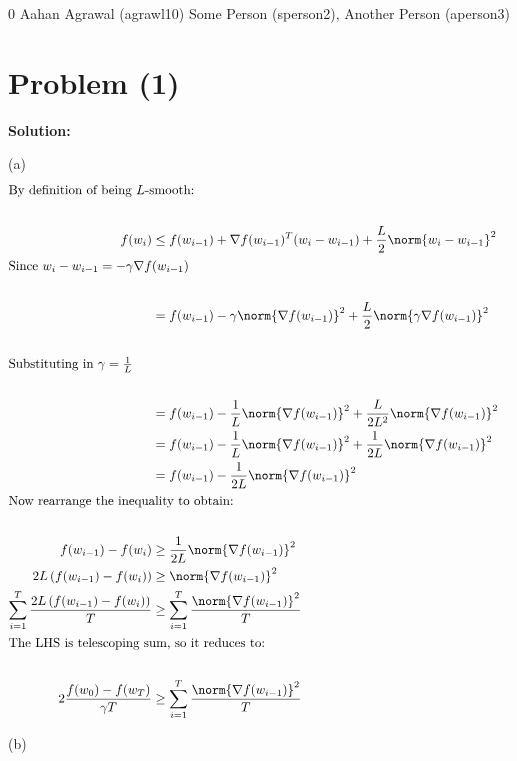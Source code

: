 \documentclass[../main.tex]{subfiles}
\begin{document}
\homework
    {0}
    {Aahan Agrawal (agrawl10)}
    {Some Person (sperson2), Another Person (aperson3)}

\section*{Problem (1)}
\textbf{Solution:} 

(a) \\
\begin{align*}
    \intertext{By definition of being $L$-smooth:} \\
    f(w_i) &\leq f(w_{i-1}) + \nabla f(w_{i-1})^T(w_{i} - w_{i-1}) + \frac{L}{2}\norm{w_{i} - w_{i-1}}^2 \\
    \intertext{Since $w_{i} - w_{i-1} = -\gamma \nabla f(w_{i-1})$} \\
    &= f(w_{i-1}) - \gamma \norm{\nabla f(w_{i-1})}^2 + \frac{L}{2}\norm{\gamma \nabla f(w_{i-1})}^2 \\ \\
    \intertext{Substituting in $\gamma = \frac{1}{L}$} \\
    &= f(w_{i-1}) - \frac{1}{L} \norm{\nabla f(w_{i-1})}^2 + \frac{L}{2L^2}\norm{ \nabla f(w_{i-1})}^2 \\
    &= f(w_{i-1}) - \frac{1}{L} \norm{\nabla f(w_{i-1})}^2 + \frac{1}{2L}\norm{ \nabla f(w_{i-1})}^2 \\
    &= f(w_{i-1}) - \frac{1}{2L} \norm{\nabla f(w_{i-1})}^2 \\
    \intertext{Now rearrange the inequality to obtain:} \\
    f(w_{i-1}) - f(w_{i}) &\geq \frac{1}{2L} \norm{\nabla f(w_{i-1})}^2 \\
    2L\left(f(w_{i-1}) - f(w_{i})\right) &\geq  \norm{\nabla f(w_{i-1})}^2 \\
    \sum_{i=1}^{T}\frac{2L\left(f(w_{i-1}) - f(w_{i})\right)}{T} &\geq  \sum_{i=1}^{T} \frac{\norm{\nabla f(w_{i-1})}^2}{T} \\
    \intertext{The LHS is telescoping sum, so it reduces to:} \\
    2\frac{f(w_0) - f(w_T)}{\gamma T}&\geq  \sum_{i=1}^{T} \frac{\norm{\nabla f(w_{i-1})}^2}{T} \\
\end{align*}

(b) \\
\end{document}
